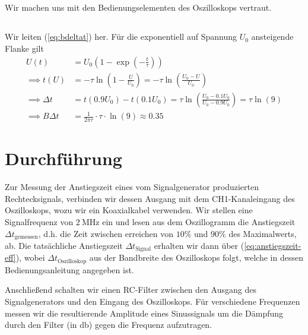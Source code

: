 \documentclass{article}
\begin{document}
\subsection{}
Wir machen uns mit den Bedienungselementen des Oszilloskops vertraut.

\subsection{}
Wir leiten (\ref{eq:bdeltat}) her. Für die exponentiell auf Spannung $U_0$ ansteigende Flanke gilt
\begin{align*}
  U(t) &= U_0 \left(1 - \exp(-\frac{t}{\tau})\right) \\
  \implies t(U) &= -\tau \ln\left(1 - \frac{U}{U_0}\right) = -\tau \ln\left(\frac{U_0-U}{U_0}\right) \\
  \implies \Delta t &= t(0.9 U_0) - t(0.1 U_0) = \tau \ln\left(\frac{U_0-0.1U_0}{U_0-0.9U_0}\right) = \tau \ln(9) \\
  \implies B \Delta t &= \frac{1}{2\pi\tau} \cdot \tau \cdot \ln(9) \approx 0.35
\end{align*}


\endgroup
\section{Durchführung}
Zur Messung der Anstiegszeit eines vom Signalgenerator produzierten Rechtecksignals,
verbinden wir dessen Ausgang mit dem CH1-Kanaleingang des Oszilloskops, wozu wir ein Koaxialkabel verwenden.
Wir stellen eine Signalfrequenz von $\SI{2}{\mega\hertz}$ ein und lesen aus dem Oszillogramm die Anstiegszeit $\Delta t_\text{gemessen}$,
d.h. die Zeit zwischen erreichen von $10\%$ und $90\%$ des Maximalwerts, ab.
Die tatsächliche Anstiegszeit $\Delta t_\text{Signal}$ erhalten wir dann über (\ref{eq:anstiegszeit-eff}),
wobei $\Delta t_\text{Oszilloskop}$ aus der Bandbreite des Oszilloskops folgt, welche in dessen Bedienungsanleitung angegeben ist.

Anschließend schalten wir einen RC-Filter zwischen den Ausgang des Signalgenerators und den Eingang des Oszilloskops. Für verschiedene
Frequenzen messen wir die resultierende Amplitude eines Sinussignals um die Dämpfung durch den Filter (in \unit{\decibel})
gegen die Frequenz aufzutragen.


\end{document}
